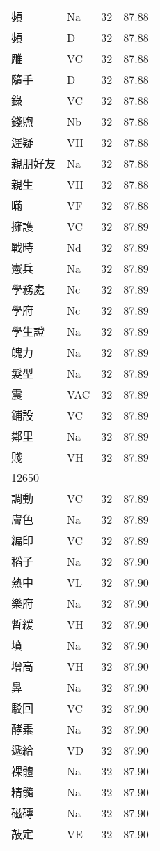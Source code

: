 \documentclass[twocolumn]{book}
\begin{document}
\begin{supertabular}{llrr}
頻 & Na & 32 &  87.88\\
頻 & D & 32 &  87.88\\
雕 & VC & 32 &  87.88\\
隨手 & D & 32 &  87.88\\
錄 & VC & 32 &  87.88\\
錢煦 & Nb & 32 &  87.88\\
遲疑 & VH & 32 &  87.88\\
親朋好友 & Na & 32 &  87.88\\
親生 & VH & 32 &  87.88\\
瞞 & VF & 32 &  87.88\\
擁護 & VC & 32 &  87.89\\
戰時 & Nd & 32 &  87.89\\
憲兵 & Na & 32 &  87.89\\
學務處 & Nc & 32 &  87.89\\
學府 & Nc & 32 &  87.89\\
學生證 & Na & 32 &  87.89\\
魄力 & Na & 32 &  87.89\\
髮型 & Na & 32 &  87.89\\
震 & VAC & 32 &  87.89\\
鋪設 & VC & 32 &  87.89\\
鄰里 & Na & 32 &  87.89\\
賤 & VH & 32 &  87.89\\
12650\\
調動 & VC & 32 &  87.89\\
膚色 & Na & 32 &  87.89\\
編印 & VC & 32 &  87.89\\
稻子 & Na & 32 &  87.90\\
熱中 & VL & 32 &  87.90\\
樂府 & Na & 32 &  87.90\\
暫緩 & VH & 32 &  87.90\\
墳 & Na & 32 &  87.90\\
增高 & VH & 32 &  87.90\\
鼻 & Na & 32 &  87.90\\
駁回 & VC & 32 &  87.90\\
酵素 & Na & 32 &  87.90\\
遞給 & VD & 32 &  87.90\\
裸體 & Na & 32 &  87.90\\
精髓 & Na & 32 &  87.90\\
磁磚 & Na & 32 &  87.90\\
敲定 & VE & 32 &  87.90\\

\end{supertabular}
\end{document}
